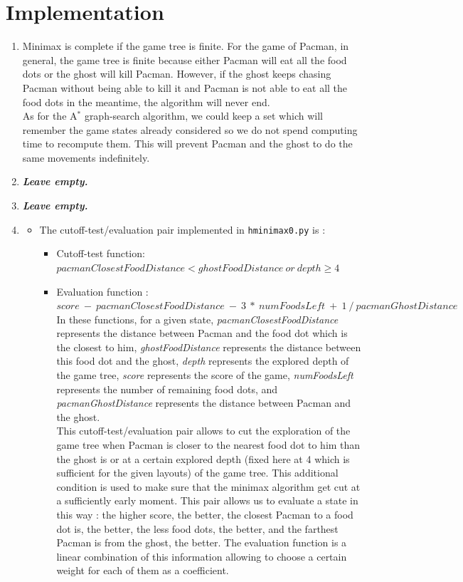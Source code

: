 \documentclass{article}
\begin{document}
\section{Implementation}

\begin{enumerate}[label=\alph*.,leftmargin=*]
    \item Minimax is complete if the game tree is finite. For the game of Pacman, in general, the game tree is finite because either Pacman will eat all the food dots or the ghost will kill Pacman. However, if the ghost keeps chasing Pacman without being able to kill it and Pacman is not able to eat all the food dots in the meantime, the algorithm will never end.\\
    As for the A$^*$ graph-search algorithm, we could keep a set which will remember the game states already considered so we do not spend computing time to recompute them. This will prevent Pacman and the ghost to do the same movements indefinitely.
    \item \textbf{\textit{Leave empty.}}
    \item \textbf{\textit{Leave empty.}}
	\item 
		\begin{itemize}
			\item The cutoff-test/evaluation pair implemented in \texttt{hminimax0.py} is :
				\begin{itemize}
					\item Cutoff-test function: $pacmanClosestFoodDistance < ghostFoodDistance \ or \ depth \geq 4$
					\item Evaluation function : $score \ - \ pacmanClosestFoodDistance \ - \ 3 \ * \ numFoodsLeft \ + \ 1 \ / \ pacmanGhostDistance$\\
					
					In these functions, for a given state, \textit{pacmanClosestFoodDistance} represents the distance between Pacman and the food dot which is the closest to him, \textit{ghostFoodDistance} represents the distance between this food dot and the ghost, \textit{depth} represents the explored depth of the game tree, \textit{score} represents the score of the game, \textit{numFoodsLeft} represents the number of remaining food dots, and \textit{pacmanGhostDistance} represents the distance between Pacman and the ghost.\\
					
					This cutoff-test/evaluation pair allows to cut the exploration of the game tree when Pacman is closer to the nearest food dot to him than the ghost is or at a certain explored depth (fixed here at 4 which is sufficient for the given layouts) of the game tree. This additional condition is used to make sure that the minimax algorithm get cut at a sufficiently early moment. This pair allows us to evaluate a state in this way : the higher score, the better, the closest Pacman to a food dot is, the better, the less food dots, the better, and the farthest Pacman is from the ghost, the better. The evaluation function is a linear combination of this information allowing to choose a certain weight for each of them as a coefficient.\\
				\end{itemize} 


\end{itemize}
\end{enumerate}
\end{document}
